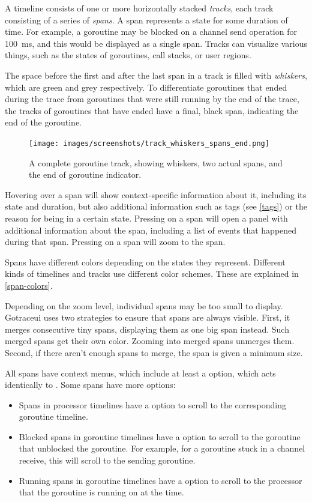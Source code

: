 \documentclass[10pt,letterpaper,oneside,openany,english]{memoir}
\newcommand{\noun}[1]{{\emph{#1}}}
\newcommand{\shortcut}{\ctrl{} or \cmdmac}
\begin{document}
A timeline consists of one or more horizontally stacked \noun{tracks},
each track consisting of a series of \noun{spans}.
A span represents a state for some duration of time.
For example, a goroutine may be blocked on a channel send operation for \qty{100}{\milli\second}, and this would be displayed as a single span.
Tracks can visualize various things, such as the states of goroutines, call stacks, or user regions.

The space before the first and after the last span in a track is filled with \emph{whiskers}, which are green and grey respectively.
To differentiate goroutines that ended during the trace from goroutines that were still running by the end of the trace,
the tracks of goroutines that have ended have a final, black span, indicating the end of the goroutine.


\begin{figure}[h]
\texttt{[image: images/screenshots/track\_whiskers\_spans\_end.png]}
\caption{
  A complete goroutine track, showing whiskers, two actual spans, and the end of goroutine indicator.
}
\end{figure}

Hovering over a span will show context-specific information about it,
including its state and duration,
but also additional information such as tags (see \cref{tags})
or the reason for being in a certain state.
Pressing  on a span will open a panel with additional information about the span, including a list of events that happened during that span.
Pressing \keys{\shortcut + LMB} on a span will zoom to the span.

Spans have different colors depending on the states they represent.
Different kinds of timelines and tracks use different color schemes.
These are explained in \cref{span-colors}.

Depending on the zoom level, individual spans may be too small to display.
Gotraceui uses two strategies to ensure that spans are always visible.
First, it merges consecutive tiny spans, displaying them as one big span instead.
Such merged spans get their own color.
Zooming into merged spans unmerges them.
Second, if there aren't enough spans to merge, the span is given a minimum size.

All spans have context menus, which include at least a  option, which acts identically to \keys{\shortcut + LMB}.
Some spans have more options:

\begin{itemize}
\item Spans in processor timelines have a  option to scroll to the corresponding goroutine timeline.
\item Blocked spans in goroutine timelines have a  option to scroll to the goroutine that unblocked the goroutine.
  For example, for a goroutine stuck in a channel receive, this will scroll to the sending goroutine.
\item Running spans in goroutine timelines have a  option to scroll to the processor that the goroutine is running on at the time.
\end{itemize}
\end{document}
